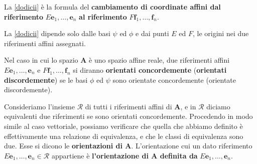 \documentclass{article}
\theoremstyle{plain}
\theoremstyle{definition}
\theoremstyle{remark}
\begin{document}
\vspace{10pt}

\begin{center}
\end{center}

\vspace{10pt}

La \ref{dodicii} è la formula del \textbf{cambiamento di coordinate affini dal riferimento} $E \mathbf{e}_1, \dots, \mathbf{e}_n$ \textbf{al riferimento} $F \mathbf{f}_1, \dots, \mathbf{f}_n$.

La \ref{dodicii} dipende solo dalle basi $\psi$ ed $\phi$ e dai punti $E$ ed $F$, le origini nei due riferimenti affini assegnati.

Nel caso in cui lo spazio $\mathbf{A}$ è uno spazio affine reale, due riferimenti affini $E \mathbf{e}_1, \dots, \mathbf{e}_n$ e $F \mathbf{f}_1, \dots, \mathbf{f}_n$ si diranno \textbf{orientati concordemente} 
(\textbf{orientati discordemente}) se le basi $\phi$ ed $\psi$ sono orientate concordemente (orientate discordemente).

\vspace{10pt}

Consideriamo l'insieme $\mathcal{R}$ di tutti i riferimenti affini di $\mathbf{A}$, e in $\mathcal{R}$ diciamo equivalenti due riferimenti se sono orientati concordemente. 
Procedendo in modo simile al caso vettoriale, possiamo verificare che quella che abbiamo definito è effettivamente una relazione di equivalenza, 
e che le classi di equivalenza sono due. Esse si dicono le \textbf{orientazioni di $\mathbf{A}$}. 
L'orientazione cui un dato riferimento $E \mathbf{e}_1, \dots, \mathbf{e}_n \in \mathcal{R}$ appartiene è \textbf{l'orientazione di $\mathbf{A}$ definita da} $E \mathbf{e}_1, \dots, \mathbf{e}_n$.
\end{document}
